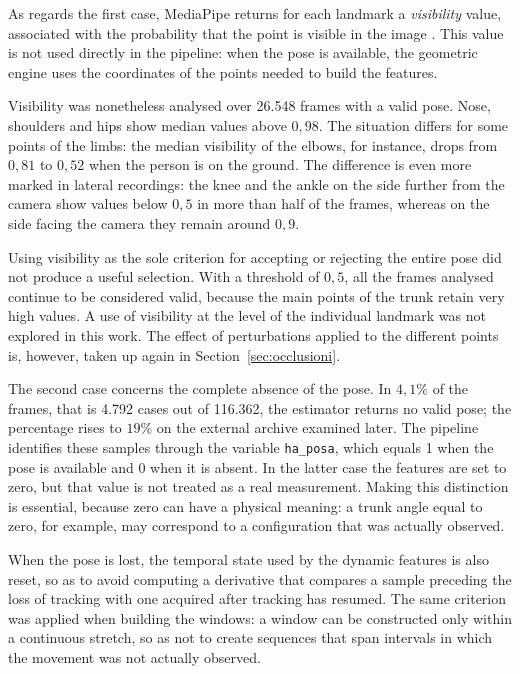 As regards the first case, MediaPipe returns for each landmark a \emph{visibility} value, associated with the probability that the point is visible in the image \cite{BL}. This value is not used directly in the pipeline: when the pose is available, the geometric engine uses the coordinates of the points needed to build the features.

Visibility was nonetheless analysed over 26.548 frames with a valid pose. Nose, shoulders and hips show median values above $0{,}98$. The situation differs for some points of the limbs: the median visibility of the elbows, for instance, drops from $0{,}81$ to $0{,}52$ when the person is on the ground. The difference is even more marked in lateral recordings: the knee and the ankle on the side further from the camera show values below $0{,}5$ in more than half of the frames, whereas on the side facing the camera they remain around $0{,}9$.

Using visibility as the sole criterion for accepting or rejecting the entire pose did not produce a useful selection. With a threshold of $0{,}5$, all the frames analysed continue to be considered valid, because the main points of the trunk retain very high values. A use of visibility at the level of the individual landmark was not explored in this work. The effect of perturbations applied to the different points is, however, taken up again in Section~\ref{sec:occlusioni}.

The second case concerns the complete absence of the pose. In $4{,}1\%$ of the frames, that is 4.792 cases out of 116.362, the estimator returns no valid pose; the percentage rises to $19\%$ on the external archive examined later. The pipeline identifies these samples through the variable \texttt{ha\_posa}, which equals 1 when the pose is available and 0 when it is absent. In the latter case the features are set to zero, but that value is not treated as a real measurement. Making this distinction is essential, because zero can have a physical meaning: a trunk angle equal to zero, for example, may correspond to a configuration that was actually observed.

When the pose is lost, the temporal state used by the dynamic features is also reset, so as to avoid computing a derivative that compares a sample preceding the loss of tracking with one acquired after tracking has resumed.
The same criterion was applied when building the windows: a window can be constructed only within a continuous stretch, so as not to create sequences that span intervals in which the movement was not actually observed.

